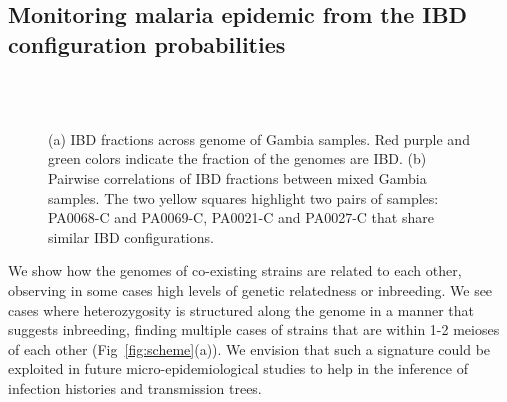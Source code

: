 \documentclass{article}
\begin{document}
\subsection{Monitoring malaria epidemic from the IBD configuration probabilities}

\begin{figure}[htp]
  \centering{}
  \\
  \\
  \caption{(a) IBD fractions across genome of Gambia samples. Red purple and green colors indicate the fraction of the genomes are IBD. (b) Pairwise correlations of IBD fractions between mixed Gambia samples. The two yellow squares highlight two pairs of samples: PA0068-C and PA0069-C, PA0021-C and PA0027-C that share similar IBD configurations.}\label{fig:gambia}
\end{figure}

We show how the genomes of co-existing strains are related to each other, observing in some cases high levels of genetic relatedness or inbreeding. We see cases where heterozygosity is structured along the genome in a manner that suggests inbreeding, finding multiple cases of strains that are within 1-2 meioses of each other (Fig~\ref{fig:scheme}(a)). We envision that such a signature could be exploited in future micro-epidemiological studies to help in the inference of infection histories and transmission trees.
\end{document}
